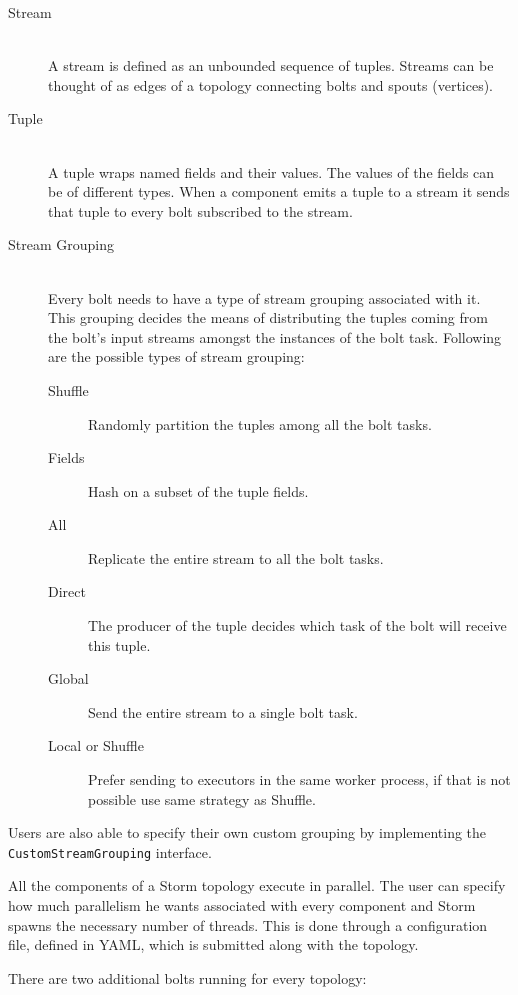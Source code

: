 \documentclass[bsc,logo,frontabs,twoside,singlespacing,normalheadings,parskip]{infthesis}\usepackage[]{graphicx}\usepackage[]{color}
\begin{document}
\begin{description}
  \item[Stream] \hfill \\
  A stream is defined as an unbounded sequence of tuples. Streams can be thought of as edges of a topology connecting bolts and spouts (vertices).
  \item[Tuple] \hfill \\
  A tuple wraps named fields and their values. The values of the fields can be of different types. When a component emits a tuple to a stream it sends that tuple to every bolt subscribed to the stream.
  \item[Stream Grouping] \hfill \\
  Every bolt needs to have a type of stream grouping associated with it. This grouping decides the means of distributing the tuples coming from the bolt's input streams amongst the instances of the bolt task. Following are the possible types of stream grouping:
  \begin{description}
  	\item[Shuffle] Randomly partition the tuples among all the bolt tasks.
  	\item[Fields] Hash on a subset of the tuple fields.
  	\item[All] Replicate the entire stream to all the bolt tasks.
  	\item[Direct] The producer of the tuple decides which task of the bolt will receive this tuple.
  	\item[Global] Send the entire stream to a single bolt task.
  	\item[Local or Shuffle] Prefer sending to executors in the same worker process, if that is not possible use same strategy as Shuffle.
  \end{description}
\end{description}

Users are also able to specify their own custom grouping by implementing the \texttt{CustomStreamGrouping} interface.

All the components of a Storm topology execute in parallel. The user can specify how much parallelism he wants associated with every component and Storm spawns the necessary number of threads. This is done through a configuration file, defined in YAML, which is submitted along with the topology.

There are two additional bolts running for every topology:
\end{document}
